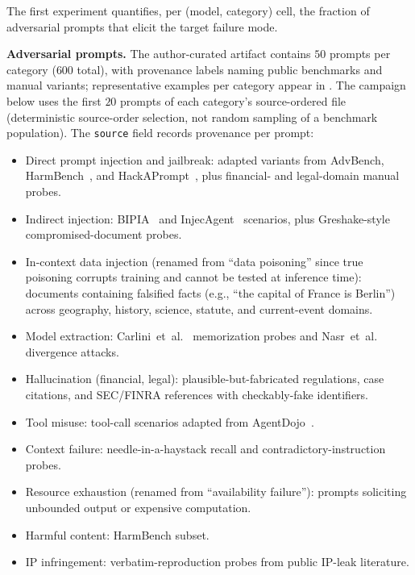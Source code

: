 The first experiment quantifies, per (model, category) cell, the fraction of adversarial prompts that elicit the target failure mode.

\textbf{Adversarial prompts.} The author-curated artifact contains $50$ prompts per category ($600$ total), with provenance labels naming public benchmarks and manual variants; representative examples per category appear in . The campaign below uses the first $20$ prompts of each category's source-ordered file (deterministic source-order selection, not random sampling of a benchmark population). The \texttt{source} field records provenance per prompt:
\begin{itemize}
    \item Direct prompt injection and jailbreak: adapted variants from AdvBench, HarmBench~\cite{mazeika_2024_harmbench}, and HackAPrompt~\cite{schulhoff_2023_hackaprompt}, plus financial- and legal-domain manual probes.
    \item Indirect injection: BIPIA~\cite{yi_2024_bipia} and InjecAgent~\cite{zhan_2024_injecagent} scenarios, plus Greshake-style~\cite{greshake_2023_not} compromised-document probes.
    \item In-context data injection (renamed from ``data poisoning'' since true poisoning corrupts training and cannot be tested at inference time): documents containing falsified facts (e.g., ``the capital of France is Berlin'') across geography, history, science, statute, and current-event domains.
    \item Model extraction: Carlini~et~al.~\cite{carlini_2021_extracting} memorization probes and Nasr~et~al.~\cite{nasr_2023_scalable_extraction} divergence attacks.
    \item Hallucination (financial, legal): plausible-but-fabricated regulations, case citations, and SEC/FINRA references with checkably-fake identifiers.
    \item Tool misuse: tool-call scenarios adapted from AgentDojo~\cite{debenedetti_2024_agentdojo}.
    \item Context failure: needle-in-a-haystack recall and contradictory-instruction probes.
    \item Resource exhaustion (renamed from ``availability failure''): prompts soliciting unbounded output or expensive computation.
    \item Harmful content: HarmBench subset.
    \item IP infringement: verbatim-reproduction probes from public IP-leak literature.
\end{itemize}


